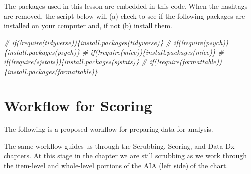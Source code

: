 \documentclass[
  11pt,
]{book}
\newenvironment{Shaded}{\begin{snugshade}}{\end{snugshade}}
\newcommand{\CommentTok}[1]{\textcolor[rgb]{0.37,0.37,0.37}{\textit{#1}}}
\begin{document}
The packages used in this lesson are embedded in this code. When the hashtags are removed, the script below will (a) check to see if the following packages are installed on your computer and, if not (b) install them.

\begin{Shaded}
\begin{Highlighting}[]
\CommentTok{\# if(!require(tidyverse))\{install.packages(\textquotesingle{}tidyverse\textquotesingle{})\}}
\CommentTok{\# if(!require(psych))\{install.packages(\textquotesingle{}psych\textquotesingle{})\}}
\CommentTok{\# if(!require(mice))\{install.packages(\textquotesingle{}mice\textquotesingle{})\}}
\CommentTok{\# if(!require(sjstats))\{install.packages(\textquotesingle{}sjstats\textquotesingle{})\}}
\CommentTok{\# if(!require(formattable))\{install.packages(\textquotesingle{}formattable\textquotesingle{})\}}
\end{Highlighting}
\end{Shaded}

\hypertarget{workflow-for-scoring}{%
\section{Workflow for Scoring}\label{workflow-for-scoring}}

The following is a proposed workflow for preparing data for analysis.

The same workflow guides us through the Scrubbing, Scoring, and Data Dx chapters. At this stage in the chapter we are still scrubbing as we work through the item-level and whole-level portions of the AIA (left side) of the chart.
\end{document}
